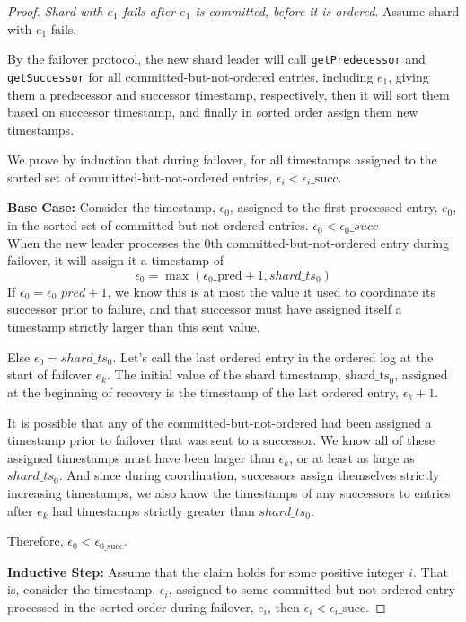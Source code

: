 \begin{proof}
 \textit{Shard with $e_1$ fails after $e_1$ is committed, before it is ordered}.
Assume shard with $e_1$ fails.

By the failover protocol, the new shard leader will call \texttt{getPredecessor} and \texttt{getSuccessor} for all committed-but-not-ordered entries, including $e_1$, giving them a predecessor and successor timestamp, respectively, then it will sort them based on successor timestamp, and finally in sorted order assign them new timestamps.

We prove by induction that during failover, for all timestamps assigned to the sorted set of committed-but-not-ordered entries, $\epsilon_i < \epsilon_i\_\text{succ}$.

\textbf{Base Case:} Consider the timestamp, $\epsilon_0$, assigned to the first processed entry, $e_0$, in the sorted set of committed-but-not-ordered entries.  $\epsilon_0 < \epsilon_0\_succ$
\\
When the new leader processes the 0th committed-but-not-ordered entry during failover, it will assign it a timestamp of
$$\epsilon_0 = \max(\epsilon_0\_\text{pred} + 1, shard\_ts_0)$$
If $\epsilon_0 = \epsilon_0\_pred + 1$, we know this is at most the value it used to coordinate its successor prior to failure, and that successor must have assigned itself a timestamp strictly larger than this sent value.

Else $\epsilon_0 = shard\_ts_0$.
Let's call the last ordered entry in the ordered log at the start of failover $e_k$. The initial value of the shard timestamp, $\text{shard\_ts}_0$, assigned at the beginning of recovery is the timestamp of the last ordered entry, $\epsilon_k + 1$. 

It is possible that any of the committed-but-not-ordered had been assigned a timestamp prior to failover that was sent to a successor. We know all of these assigned timestamps must have been larger than $\epsilon_k$, or at least as large as $shard\_ts_0$. And since during coordination, successors assign themselves strictly increasing timestamps, we also know the timestamps of any successors to entries after $e_k$ had timestamps strictly greater than $shard\_ts_0$.

Therefore, $\epsilon_0 < \epsilon_{0\_\text{succ}}$.


\textbf{Inductive Step:} Assume that the claim holds for some positive integer $i$. That is, consider the timestamp, $\epsilon_i$, assigned to some committed-but-not-ordered entry processed in the sorted order during failover, $e_i$, then $\epsilon_i < \epsilon_i\_\text{succ}$.


\end{proof}
